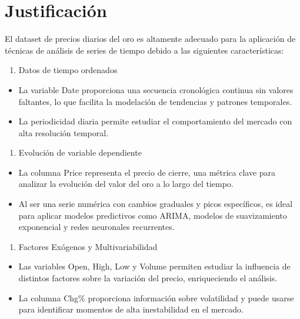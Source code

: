 \documentclass[
]{book}
\providecommand{\tightlist}{%
  \setlength{\itemsep}{0pt}\setlength{\parskip}{0pt}}
\begin{document}
\chapter{Justificación}\label{justificaciuxf3n}

El dataset de precios diarios del oro es altamente adecuado para la aplicación de técnicas de análisis de series de tiempo debido a las siguientes características:

\begin{enumerate}
\def\labelenumi{\arabic{enumi}.}
\tightlist
\item
  Datos de tiempo ordenados
\end{enumerate}

\begin{itemize}
\tightlist
\item
  La variable Date proporciona una secuencia cronológica continua sin valores faltantes, lo que facilita la modelación de tendencias y patrones temporales.
\item
  La periodicidad diaria permite estudiar el comportamiento del mercado con alta resolución temporal.
\end{itemize}

\begin{enumerate}
\def\labelenumi{\arabic{enumi}.}
\setcounter{enumi}{1}
\tightlist
\item
  Evolución de variable dependiente
\end{enumerate}

\begin{itemize}
\tightlist
\item
  La columna Price representa el precio de cierre, una métrica clave para analizar la evolución del valor del oro a lo largo del tiempo.
\item
  Al ser una serie numérica con cambios graduales y picos específicos, es ideal para aplicar modelos predictivos como ARIMA, modelos de suavizamiento exponencial y redes neuronales recurrentes.
\end{itemize}

\begin{enumerate}
\def\labelenumi{\arabic{enumi}.}
\setcounter{enumi}{2}
\tightlist
\item
  Factores Exógenos y Multivariabilidad
\end{enumerate}

\begin{itemize}
\tightlist
\item
  Las variables Open, High, Low y Volume permiten estudiar la influencia de distintos factores sobre la variación del precio, enriqueciendo el análisis.
\item
  La columna Chg\% proporciona información sobre volatilidad y puede usarse para identificar momentos de alta inestabilidad en el mercado.
\end{itemize}
\end{document}
